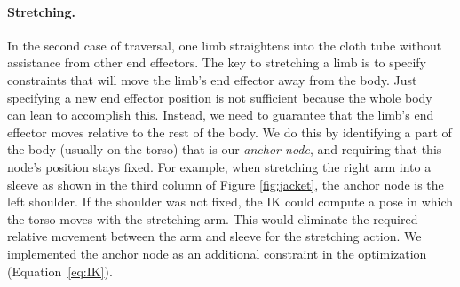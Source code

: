 \paragraph{Stretching.} In the second case of traversal, one limb straightens into the cloth tube without assistance from other end effectors. The key to stretching a limb is to specify constraints that will move the limb's end effector away from the body. Just specifying a new end effector position is not sufficient because the whole body can lean to accomplish this.  Instead, we need to guarantee that the limb's end effector moves relative to the rest of the body.  We do this by identifying a part of the body (usually on the torso) that is our \emph{anchor node}, and requiring that this node's position stays fixed. For example, when stretching the right arm into a sleeve as shown in the third column of Figure \ref{fig:jacket}, the anchor node is the left shoulder. If the shoulder was not fixed, the IK could compute a pose in which the torso moves with the stretching arm. This would eliminate the required relative movement between the arm and sleeve for the stretching action. We implemented the anchor node as an additional constraint in the optimization (Equation~\ref{eq:IK}).



